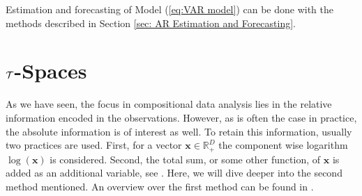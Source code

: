 Estimation and forecasting of Model (\ref{eq:VAR model}) can be done with the methods described in Section \ref{sec: AR Estimation and Forecasting}.
%
%
%
%

\section{$\mathcal{T}$-Spaces}
\label{sec: Tspaces}

As we have seen, the focus in compositional data analysis lies in the relative information encoded in the observations. However, as is often the case in practice, the absolute information is of interest as well. To retain this information, usually two practices are used. First, for a vector $\bm{x} \in \mathbb{R}^D_+$ the component wise logarithm $\log(\bm{x})$ is considered. Second, the total sum, or some other function, of $\bm{x}$ is added as an additional variable, see \textcite{Pawlowsky:2013}. Here, we will dive deeper into the second method mentioned. An overview over the first method can be found in \textcite{Pawlowsky:2013}. 


